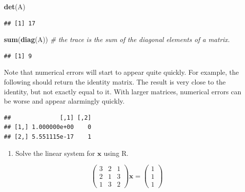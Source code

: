 \documentclass[]{book}
\newenvironment{Shaded}{\begin{snugshade}}{\end{snugshade}}
\newcommand{\CommentTok}[1]{\textcolor[rgb]{0.56,0.35,0.01}{\textit{#1}}}
\newcommand{\KeywordTok}[1]{\textcolor[rgb]{0.13,0.29,0.53}{\textbf{#1}}}
\newcommand{\NormalTok}[1]{#1}
\newcommand{\OperatorTok}[1]{\textcolor[rgb]{0.81,0.36,0.00}{\textbf{#1}}}
\providecommand{\tightlist}{%
  \setlength{\itemsep}{0pt}\setlength{\parskip}{0pt}}
\theoremstyle{definition}
\theoremstyle{definition}
\theoremstyle{definition}
\theoremstyle{remark}
\begin{document}
\begin{Shaded}
\begin{Highlighting}[]
\KeywordTok{det}\NormalTok{(A)}
\end{Highlighting}
\end{Shaded}

\begin{verbatim}
## [1] 17
\end{verbatim}

\begin{Shaded}
\begin{Highlighting}[]
\KeywordTok{sum}\NormalTok{(}\KeywordTok{diag}\NormalTok{(A)) }\CommentTok{# the trace is the sum of the diagonal elements of a matrix.}
\end{Highlighting}
\end{Shaded}

\begin{verbatim}
## [1] 9
\end{verbatim}

Note that numerical errors will start to appear quite quickly. For example, the following should return the identity matrix. The result is very close to the identity, but not exactly equal to it. With larger matrices, numerical errors can be worse and appear alarmingly quickly.

\begin{Shaded}
\end{Shaded}

\begin{verbatim}
##              [,1] [,2]
## [1,] 1.000000e+00    0
## [2,] 5.551115e-17    1
\end{verbatim}

\begin{enumerate}
\def\labelenumi{\arabic{enumi}.}
\tightlist
\item
  Solve the linear system for \(\mathbf x\) using R.
\end{enumerate}

\[\left(\begin{array}{ccc} 3&2&1\\2&1&3\\ 1&3&2\end{array}\right) \mathbf x=\left(\begin{array}{c} 1\\1\\ 1\end{array}\right)\]
\end{document}

